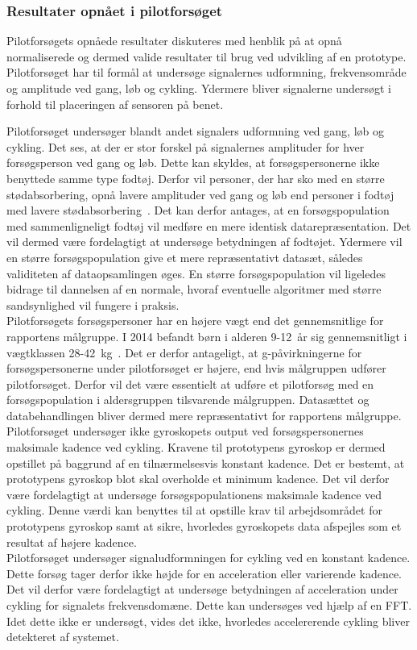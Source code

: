 \subsubsection{Resultater opnået i pilotforsøget}
Pilotforsøgets opnåede resultater diskuteres med henblik på at opnå normaliserede og dermed valide resultater til brug ved udvikling af en prototype.\\
Pilotforsøget har til formål at undersøge signalernes udformning, frekvensområde og amplitude ved gang, løb og cykling. Ydermere bliver signalerne undersøgt i forhold til placeringen af sensoren på benet. 

Pilotforsøget undersøger blandt andet signalers udformning ved gang, løb og cykling. Det ses, at der er stor forskel på signalernes amplituder for hver forsøgsperson ved gang og løb. Dette kan skyldes, at forsøgspersonerne ikke benyttede samme type fodtøj. Derfor vil personer, der har sko med en større stødabsorbering, opnå lavere amplituder ved gang og løb end personer i fodtøj med lavere stødabsorbering~\citep{Novacheck1998}. Det kan derfor antages, at en forsøgspopulation med sammenligneligt fodtøj vil medføre en mere identisk datarepræsentation. Det vil dermed være fordelagtigt at undersøge betydningen af fodtøjet. Ydermere vil en større forsøgspopulation give et mere repræsentativt datasæt, således validiteten af dataopsamlingen øges. En større forsøgspopulation vil ligeledes bidrage til dannelsen af en normale, hvoraf eventuelle algoritmer med større sandsynlighed vil fungere i praksis.\\
Pilotforsøgets forsøgspersoner har en højere vægt end det gennemsnitlige for rapportens målgruppe. I 2014 befandt børn i alderen 9-12~år sig gennemsnitligt i vægtklassen 28-42~kg~\citep{Rigsholspitalet2014}. Det er derfor antageligt, at g-påvirkningerne for forsøgspersonerne under pilotforsøget er højere, end hvis målgruppen udfører pilotforsøget. Derfor vil det være essentielt at udføre et pilotforsøg med en forsøgspopulation i aldersgruppen tilsvarende målgruppen. Datasættet og databehandlingen bliver dermed mere repræsentativt for rapportens målgruppe.\\
Pilotforsøget undersøger ikke gyroskopets output ved forsøgspersonernes maksimale kadence ved cykling. Kravene til prototypens gyroskop er dermed opstillet på baggrund af en tilnærmelsesvis konstant kadence. Det er bestemt, at prototypens gyroskop blot skal overholde et minimum kadence. Det vil derfor være fordelagtigt at undersøge forsøgspopulationens maksimale kadence ved cykling. Denne værdi kan benyttes til at opstille krav til arbejdsområdet for prototypens gyroskop samt at sikre, hvorledes gyroskopets data afspejles som et resultat af højere kadence.\\
Pilotforsøget undersøger signaludformningen for cykling ved en konstant kadence. Dette forsøg tager derfor ikke højde for en acceleration eller varierende kadence. Det vil derfor være fordelagtigt at undersøge betydningen af acceleration under cykling for signalets frekvensdomæne. Dette kan undersøges ved hjælp af en FFT. Idet dette ikke er undersøgt, vides det ikke, hvorledes accelererende cykling bliver detekteret af systemet.

